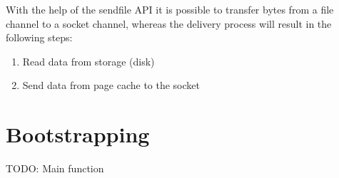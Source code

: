 With the help of the sendfile API  it is possible to transfer bytes
from a file channel to a socket channel, whereas the delivery process will
result in the following steps:

\begin{enumerate}
  \item Read data from storage (disk)
  \item Send data from page cache to the socket
\end{enumerate}


\section{Bootstrapping}
TODO: Main function 

